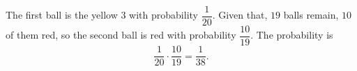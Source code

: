 The first ball is the yellow $3$ with probability $\dfrac1{20}$. Given that, $19$ balls remain, $10$ of them red, so the second ball is red with probability $\dfrac{10}{19}$. The probability is
\[\dfrac{1}{20}\cdot\dfrac{10}{19}=\boxed{\dfrac{1}{38}}.\]
